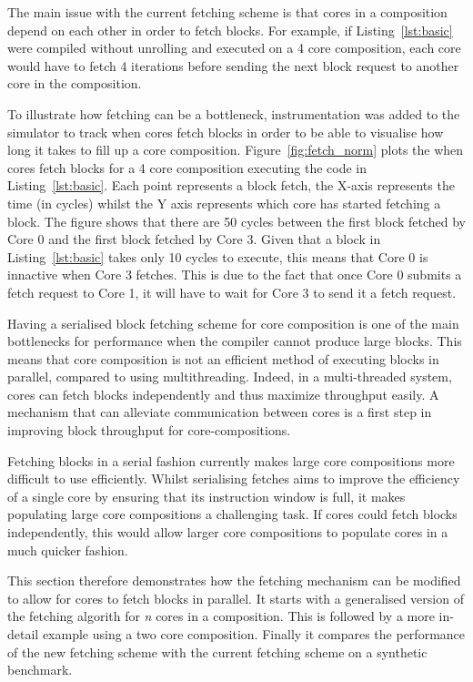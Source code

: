 The main issue with the current fetching scheme is that cores in a composition depend on each other in order to fetch blocks.
For example, if Listing~\ref{lst:basic} were compiled without unrolling and executed on a 4 core composition, each core would have to fetch 4 iterations before sending the next block request to another core in the composition.

To illustrate how fetching can be a bottleneck, instrumentation was added to the simulator to track when cores fetch blocks in order to be able to visualise how long it takes to fill up a core composition.
Figure~\ref{fig:fetch_norm} plots the when cores fetch blocks for a 4 core composition executing the code in Listing~\ref{lst:basic}.
Each point represents a block fetch, the X-axis represents the time (in cycles) whilst the Y axis represents which core has started fetching a block.
The figure shows that there are 50 cycles between the first block fetched by Core 0 and the first block fetched by Core 3.
Given that a block in Listing~\ref{lst:basic} takes only 10 cycles to execute, this means that Core 0 is innactive when Core 3 fetches.
This is due to the fact that once Core 0 submits a fetch request to Core 1, it will have to wait for Core 3 to send it a fetch request.

Having a serialised block fetching scheme for core composition is one of the main bottlenecks for performance when the compiler cannot produce large blocks.
This means that core composition is not an efficient method of executing blocks in parallel, compared to using multithreading.
Indeed, in a multi-threaded system, cores can fetch blocks independently and thus maximize throughput easily.
A mechanism that can alleviate communication between cores is a first step in improving block throughput for core-compositions.


Fetching blocks in a serial fashion currently makes large core compositions more difficult to use efficiently.
Whilst serialising fetches aims to improve the efficiency of a single core by ensuring that its instruction window is full, it makes populating large core compositions a challenging task.
If cores could fetch blocks independently, this would allow larger core compositions to populate cores in a much quicker fashion.

This section therefore demonstrates how the fetching mechanism can be modified to allow for cores to fetch blocks in parallel.
It starts with a generalised version of the fetching algorith for \textit{n} cores in a composition.
This is followed by a more in-detail example using a two core composition.
Finally it compares the performance of the new fetching scheme with the current fetching scheme on a synthetic benchmark.

